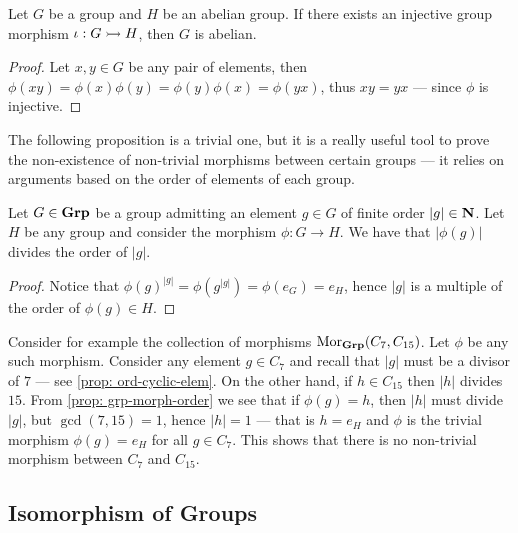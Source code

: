 \begin{proposition}
\label{prop:injective-morphism-abelian}
Let \(G\) be a group and \(H\) be an abelian group. If there exists an injective
group morphism \(\iota: G \rightarrowtail H\), then \(G\) is abelian.
\end{proposition}

\begin{proof}
Let \(x, y \in G\) be any pair of elements, then \(\phi(x y) = \phi(x) \phi(y) =
\phi(y) \phi(x) = \phi(y x)\), thus \(x y = y x\) --- since \(\phi\) is
injective.
\end{proof}

The following proposition is a trivial one, but it is a really useful tool to
prove the non-existence of non-trivial morphisms between certain groups --- it
relies on arguments based on the order of elements of each group.

\begin{proposition}\label{prop: grp-morph-order}
Let \(G \in {\textbf{Grp}}\) be a group admitting an element \(g \in G\) of finite order
\(|g| \in \mathbf{N}\). Let \(H\) be any group and consider the morphism \(\phi: G \to
H\). We have that \(|\phi(g)|\) divides the order of \(|g|\).
\end{proposition}

\begin{proof}
Notice that \({\phi(g)}^{|g|} = \phi(g^{|g|}) = \phi(e_G) = e_H\), hence \(|g|\)
is a multiple of the order of \(\phi(g) \in H\).
\end{proof}

\begin{example}
Consider for example the collection of morphisms \(\operatorname{Mor}_{\textbf{Grp}}(C_7, C_{15})\).
Let \(\phi\) be any such morphism. Consider any element \(g \in C_7\) and
recall that \(|g|\) must be a divisor of \(7\) --- see \cref{prop:
ord-cyclic-elem}. On the other hand, if \(h \in C_{15}\) then \(|h|\) divides
\(15\). From \cref{prop: grp-morph-order} we see that if \(\phi(g) = h\), then
\(|h|\) must divide \(|g|\), but \(\gcd(7, 15) = 1\), hence
\(|h| = 1\) --- that is \(h = e_H\) and \(\phi\) is the trivial morphism
\(\phi(g) = e_H\) for all \(g \in C_7\). This shows that there is no
non-trivial morphism between \(C_7\) and \(C_{15}\).
\end{example}

\subsection{Isomorphism of Groups}

